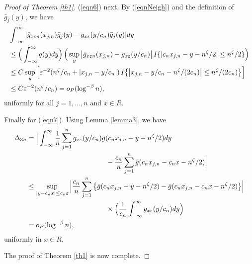 \begin{proof}[Proof of Theorem \ref{th1}]
(\ref{eqn6}) next. By (\ref{eqnNeigh}) and the definition of $\bar{g}_j(y)$, we have
\begin{align}
&\int_{-\infty}^{\infty} | \bar{g}_{x\varepsilon n}(x_{j,n}) \bar{g}_j(y) - g_{x \varepsilon}(y / c_n) \bar{g}_j(y)  | dy\nonumber\\
&\le \Big ( \int_{-\infty}^{\infty} g(y) dy \Big ) \, \Big ( \sup_y \big | \bar{g}_{x\varepsilon n}(x_{j,n})  - g_{x \varepsilon}(y / c_n)  \big |\,  I\{ | c_n x_{j, n} - y - n^{\zeta} / 2| \le n^{\zeta} / 2\} \Big ) \nonumber\\
&\le C \sup_y \Big [ \varepsilon^{-2} ( n^{\zeta} / c_n + |x_{j, n} - y / c_n | ) \,  I\big \{ \big | x_{j, n} - y / c_n - n^{\zeta} /(2c_n)\big | \le n^{\zeta} / (2c_n)\big \} \Big ] \nonumber\\
&\le C\varepsilon^{-2} ( n^{\zeta} / c_n ) = o_{P} (\log^{-\beta} n), \nonumber
\end{align}
uniformly for all $j = 1, ..., n$ and $x \in R$.

Finally for (\ref{eqn7}). Using Lemma \ref{lemma3}, we have
\begin{align}
\Delta_{3n} &=\Big{|}\int_{-\infty}^{\infty}\frac{1}{n}\sum_{j=1}^{n}g_{x\varepsilon}(y/c_n)\bar g(c_nx_{j,n}-y-n^{\zeta}/2)dy\no\\
&\hskip 4cm -\frac{c_n}{n}\sum_{j=1}^{n}\bar g(c_nx_{j,n}-c_n x-n^{\zeta} / 2)\Big{|}\no\\
&\leq\sup_{|y-c_nx|\leq c_{n}\varepsilon}\Big{|} \frac{c_n}{{n}}\sum_{j=1}^{n} \big \{ \bar g(c_nx_{j,n}-y-n^{\zeta}/2)-\bar g(c_nx_{j,n}-c_nx-n^{\zeta}/2) \big \}\Big{|} \no\\
&\hskip 4cm \times \Big(\frac{1}{c_{n}}\int_{-\infty}^{\infty}g_{x\varepsilon}(y/c_n)dy \Big )\no\\
&= o_{P}(\log^{-\beta} n),
\end{align}
uniformly in $x \in R$.

The proof of Theorem \ref{th1} is now complete.
\end{proof}





